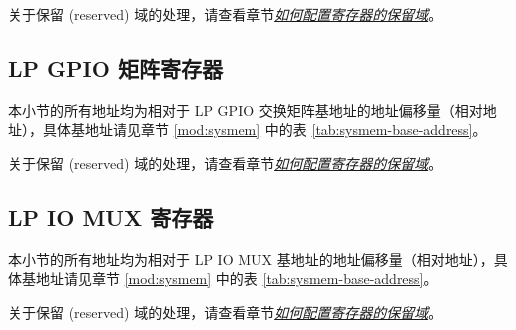 \documentclass[main\_\_CN.tex]{subfiles}
\begin{document}
关于保留 (reserved) 域的处理，请查看章节\hyperref[programming-reserved-field]{\textit{如何配置寄存器的保留域}}。



\subsection{LP GPIO 矩阵寄存器}
本小节的所有地址均为相对于 LP GPIO 交换矩阵基地址的地址偏移量（相对地址），具体基地址请见章节 \ref{mod:sysmem} \textit{} 中的表 \ref{tab:sysmem-base-address}。

关于保留 (reserved) 域的处理，请查看章节\hyperref[programming-reserved-field]{\textit{如何配置寄存器的保留域}}。



\subsection{LP IO MUX 寄存器}
本小节的所有地址均为相对于 LP IO MUX 基地址的地址偏移量（相对地址），具体基地址请见章节 \ref{mod:sysmem} \textit{} 中的表 \ref{tab:sysmem-base-address}。

关于保留 (reserved) 域的处理，请查看章节\hyperref[programming-reserved-field]{\textit{如何配置寄存器的保留域}}。


\end{document}
